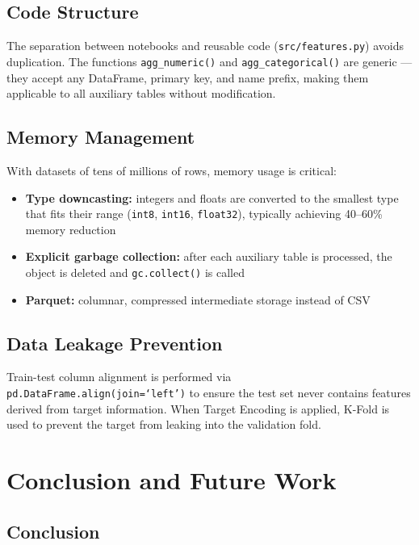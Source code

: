 \documentclass[12pt, a4paper]{article}
\begin{document}
\subsection{Code Structure}

The separation between notebooks and reusable code (\texttt{src/features.py}) avoids
duplication. The functions \texttt{agg\_numeric()} and \texttt{agg\_categorical()} are
generic --- they accept any DataFrame, primary key, and name prefix, making them
applicable to all auxiliary tables without modification.

\subsection{Memory Management}

With datasets of tens of millions of rows, memory usage is critical:

\begin{itemize}
    \item \textbf{Type downcasting:} integers and floats are converted to the smallest
          type that fits their range (\texttt{int8}, \texttt{int16}, \texttt{float32}),
          typically achieving 40--60\% memory reduction
    \item \textbf{Explicit garbage collection:} after each auxiliary table is processed,
          the object is deleted and \texttt{gc.collect()} is called
    \item \textbf{Parquet:} columnar, compressed intermediate storage instead of CSV
\end{itemize}

\subsection{Data Leakage Prevention}

Train-test column alignment is performed via \texttt{pd.DataFrame.align(join=`left')}
to ensure the test set never contains features derived from target information. When
Target Encoding is applied, K-Fold is used to prevent the target from leaking into
the validation fold.

\section{Conclusion and Future Work}

\subsection{Conclusion}
\end{document}
